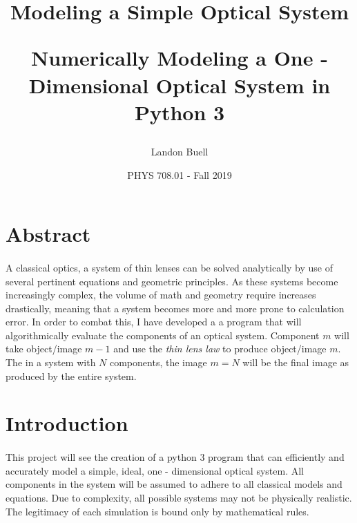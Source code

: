 \documentclass[12pt,letterpaper]{article}
\begin{document}

\title{
\begin{Huge}
Modeling a Simple Optical System\\
\end{Huge}
\vspace*{5mm}
\Large Numerically Modeling a One - Dimensional Optical System in Python 3}
\author{Landon Buell}
\date{PHYS 708.01 - Fall 2019}
\maketitle



\section{Abstract}
\paragraph*{}A classical optics, a system of thin lenses can be solved analytically by use of several pertinent equations and geometric principles. As these systems become increasingly complex, the volume of math and geometry require increases drastically, meaning that a system becomes more and more prone to calculation error. In order to combat this, I have developed a a program that will algorithmically evaluate the components of an optical system. Component $m$ will take object/image $m-1$ and use the \textit{thin lens law} to produce object/image $m$. The in a system with $N$ components, the image $m = N$ will be the final image as produced by the entire system.


\section{Introduction}
\paragraph*{}This project will see the creation of a python 3 program that can efficiently and accurately model a simple, ideal, one - dimensional optical system. All components in the system will be assumed to adhere to all classical models and equations. Due to complexity, all possible systems may not be physically realistic. The legitimacy of each simulation is bound only by mathematical rules.
\end{document}
